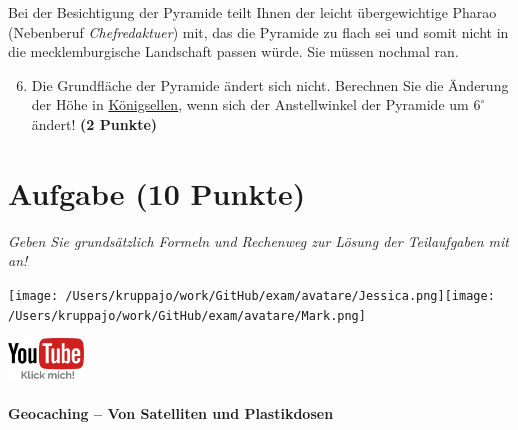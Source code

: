 \documentclass[a4paper, 9pt]{scrartcl}\usepackage[]{graphicx}\usepackage[]{xcolor}
\begin{document}
Bei der Besichtigung der Pyramide teilt Ihnen der leicht übergewichtige Pharao (Nebenberuf \textit{Chefredaktuer}) mit, das die Pyramide zu flach sei und somit nicht in die mecklemburgische Landschaft passen würde. Sie müssen nochmal ran.

\begin{enumerate}
  \setcounter{enumi}{5}
\item Die Grundfläche der Pyramide ändert sich nicht. Berechnen Sie die Änderung der Höhe in \underline{Königsellen}, wenn sich der Anstellwinkel der Pyramide um $6^\circ$ ändert!  \textbf{(2 Punkte)}
\end{enumerate}



\clearpage

\section{Aufgabe \hfill (10 Punkte)}

\textit{Geben Sie grundsätzlich Formeln und Rechenweg zur Lösung der Teilaufgaben mit an!} \\[1Ex]
 

 
\begin{minipage}[t]{0.5\textwidth}
\texttt{[image: /Users/kruppajo/work/GitHub/exam/avatare/Jessica.png]}\hspace{-4mm}\texttt{[image: /Users/kruppajo/work/GitHub/exam/avatare/Mark.png]}
\end{minipage}
\begin{minipage}[t]{0.5\textwidth}
\hfill
\href{https://youtu.be/3LAq3R0rS14}{\includegraphics[width = 2cm]{img/youtube}}
\end{minipage}




\paragraph{Geocaching -- Von Satelliten und Plastikdosen}
\end{document}
